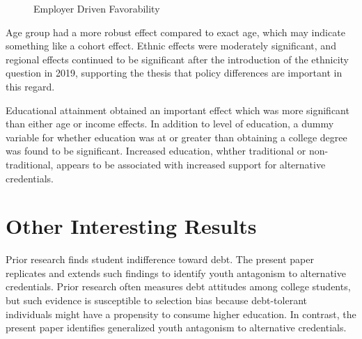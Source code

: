 \documentclass[AER]{./aea-latex-templates/AEA}
\begin{document}
\begin{figure}[h!]
    \centering
    \caption{Employer Driven Favorability}


    \label{fig:employer_driven_favorability}
    \end{figure}

Age group had a more robust effect compared to exact age, which may
indicate something like a cohort effect. Ethnic effects were moderately
significant, and regional effects continued to be significant after the
introduction of the ethnicity question in 2019, supporting the thesis
that policy differences are important in this regard.

Educational attainment obtained an important effect which was more
significant than either age or income effects. In addition to level of
education, a dummy variable for whether education was at or greater than
obtaining a college degree was found to be significant. Increased
education, whther traditional or non-traditional, appears to be
associated with increased support for alternative credentials.

\section{Other Interesting Results}

Prior research finds student indifference toward debt\cite{davies1995student}.
The present paper replicates and extends such
findings to identify youth antagonism to alternative credentials. Prior
research often measures debt attitudes among college students, but such
evidence is susceptible to selection bias because debt-tolerant
individuals might have a propensity to consume higher education. In
contrast, the present paper identifies generalized youth antagonism to
alternative credentials.
\end{document}
